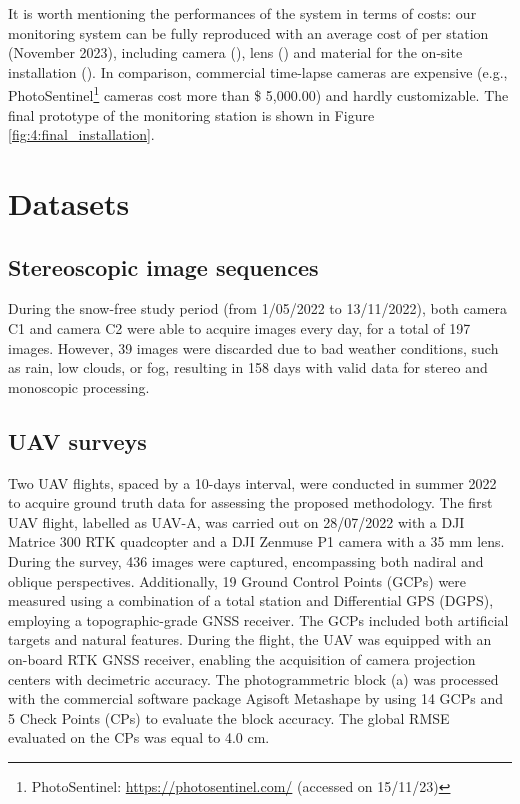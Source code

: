 It is worth mentioning the performances of the system in terms of costs: our  monitoring
system can be fully reproduced with an average cost of  per station
(November 2023), including camera (), lens () and material for
the on-site installation ().
In comparison, commercial time-lapse cameras are expensive
(e.g., PhotoSentinel\footnote{PhotoSentinel: \url{https://photosentinel.com/} (accessed
  on 15/11/23)} cameras cost more than \$ 5,000.00) and hardly customizable.
The final prototype of the monitoring station is shown in Figure
\ref{fig:4:final_installation}.

\section{Datasets}\label{sec:4:datasets}

\subsection{Stereoscopic image sequences}\label{sec:4:stereo}

During the snow-free study period (from 1/05/2022 to 13/11/2022), both camera C1 and
camera C2 were able to acquire images every day, for a total of 197 images. However, 39
images were discarded due to bad weather conditions, such as rain, low clouds, or fog,
resulting in 158 days with valid data for stereo and monoscopic processing.

\subsection{UAV surveys}\label{sec:4:uavsurveys}

Two UAV flights, spaced by a 10-days interval, were conducted in summer 2022 to acquire
ground truth data for assessing the proposed methodology.
The first UAV flight, labelled as UAV-A, was carried out on 28/07/2022 with a DJI
Matrice 300 RTK quadcopter and a DJI Zenmuse P1 camera with a 35 mm lens.
During the survey, 436 images were captured, encompassing both nadiral and oblique
perspectives.
Additionally, 19 Ground Control Points (GCPs) were measured using a combination of a
total station and Differential GPS (DGPS), employing a topographic-grade
GNSS receiver.
The GCPs included both artificial targets and natural features.
During the flight, the UAV was equipped with an on-board RTK GNSS receiver, enabling the
acquisition of camera projection centers with decimetric accuracy.
The photogrammetric block (a) was processed with the commercial
software package Agisoft Metashape \citep{agisoft} by using 14 GCPs and 5 Check Points
(CPs) to evaluate the block accuracy.
The global RMSE evaluated on the CPs was equal to 4.0 cm.

